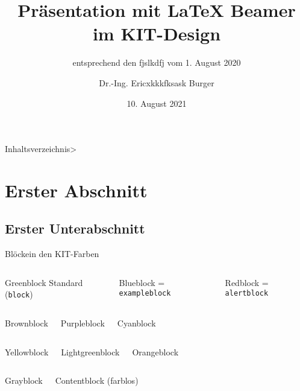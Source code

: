 \documentclass{sdqbeamer}
\title[KIT-Beamer-Vorlage]{Präsentation mit \LaTeX{} Beamer im KIT-Design}
\subtitle{entsprechend den fjslkdfj vom 1. August 2020}
\author[Erik Burger]{Dr.-Ing. Ericxkkkfksask Burger}
\date[10.\,8.\,2021]{10. August 2021}
\begin{document}
 
\KITtitleframe

\begin{frame}{Inhaltsverzeichnis}>
\tableofcontents
\end{frame}

\section{Erster Abschnitt}

\subsection{Erster Unterabschnitt}
\begin{frame}{Blöcke}{in den KIT-Farben}
	\begin{columns}
		\begin{greenblock}{Greenblock}
			Standard (\texttt{block})
        \end{greenblock}
		\begin{blueblock}{Blueblock}
			= \texttt{exampleblock}
        \end{blueblock}
		\begin{redblock}{Redblock}
			= \texttt{alertblock}
        \end{redblock}
	\end{columns}
	\begin{columns}
		\column{.3\textwidth}
        \begin{brownblock}{Brownblock}
        \end{brownblock}
		\column{.3\textwidth}
        \begin{purpleblock}{Purpleblock}
        \end{purpleblock}
		\column{.3\textwidth}
        \begin{cyanblock}{Cyanblock}
        \end{cyanblock}
	\end{columns}
	\begin{columns}
        \begin{yellowblock}{Yellowblock}
        \end{yellowblock}
        \begin{lightgreenblock}{Lightgreenblock}
        \end{lightgreenblock}
        \begin{orangeblock}{Orangeblock}
        \end{orangeblock}
	\end{columns}
	\begin{columns}
		\column{.3\textwidth}
        \begin{grayblock}{Grayblock}
        \end{grayblock}
		\column{.3\textwidth}
		\begin{contentblock}{Contentblock}
			(farblos)
		\end{contentblock}
		\column{.3\textwidth}
	\end{columns}
\end{frame}
	  
\end{document}
